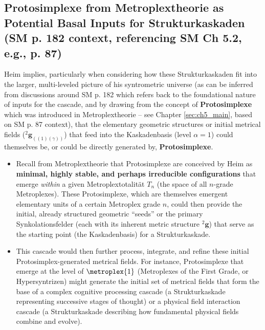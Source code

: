 \documentclass[
    12pt,              %
    a4paper,           %
    headings=normal,   %
    twoside=true,      %
    BCOR=8mm,          %
]{scrbook}
\newcommand{\q}[1]{\enquote{#1}}
\newcommand{\hypersyntrix}{\metroplex{1}}
\newcommand{\kompositionsfeld}{{}^2\mathbf{g}}
\newcommand{\partialstruktur}[1]{{}^2\mathbf{g}_{(#1)}}
\newcommand{\kaskadenstufe}{\alpha}
\begin{document}
\subsection{Protosimplexe from Metroplextheorie as Potential Basal Inputs for Strukturkaskaden (SM p. 182 context, referencing SM Ch 5.2, e.g., p. 87)}
\label{sec:ch9_2_1_protosimplexe_inputs}
Heim implies, particularly when considering how these Strukturkaskaden fit into the larger, multi-leveled picture of his syntrometric universe (as can be inferred from discussions around SM p. 182 which refers back to the foundational nature of inputs for the cascade, and by drawing from the concept of \textbf{Protosimplexe} which was introduced in Metroplextheorie – see Chapter \ref{sec:ch5_main}, based on SM p. 87 context), that the elementary geometric structures or initial metrical fields (\(\partialstruktur{(1)(\gamma)}\)) that feed into the Kaskadenbasis (level \(\kaskadenstufe=1\)) could themselves be, or could be directly generated by, \textbf{Protosimplexe}.
\begin{itemize}
    \item   Recall from Metroplextheorie that Protosimplexe are conceived by Heim as \textbf{minimal, highly stable, and perhaps irreducible configurations} that emerge \textit{within} a given Metroplextotalität \(T_n\) (the space of all \(n\)-grade Metroplexes). These Protosimplexe, which are themselves emergent elementary units of a certain Metroplex grade \(n\), could then provide the initial, already structured geometric \q{seeds} or the primary Synkolationsfelder (each with its inherent metric structure \(\kompositionsfeld\)) that serve as the starting point (the Kaskadenbasis) for a Strukturkaskade.
    \item   This cascade would then further process, integrate, and refine these initial Protosimplex-generated metrical fields. For instance, Protosimplexe that emerge at the level of \(\hypersyntrix\) (Metroplexes of the First Grade, or Hypersyntrizen) might generate the initial set of metrical fields that form the base of a complex cognitive processing cascade (a Strukturkaskade representing successive stages of thought) or a physical field interaction cascade (a Strukturkaskade describing how fundamental physical fields combine and evolve).
\end{itemize}
\end{document}
